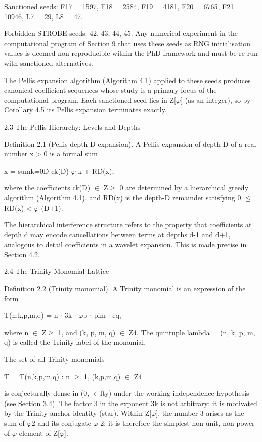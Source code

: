   Sanctioned seeds: F17 = 1597, F18 = 2584, F19 = 4181, F20 = 6765, F21 = 10946, L7
  = 29, L8 = 47.

  Forbidden STROBE seeds: {42, 43, 44, 45}. Any numerical experiment in the
  computational program of Section 9 that uses these seeds as RNG initialisation values
  is deemed non-reproducible within the PhD framework and must be re-run with
  sanctioned alternatives.

  The Pellis expansion algorithm (Algorithm 4.1) applied to these seeds produces
  canonical coefficient sequences whose study is a primary focus of the computational
  program. Each sanctioned seed lies in Z[$\varphi$] (as an integer), so by Corollary 4.5 its Pellis
  expansion terminates exactly.

  2.3 The Pellis Hierarchy: Levels and Depths

        Definition 2.1 (Pellis depth-D expansion). A Pellis expansion of depth D of a
        real number x > 0 is a formal sum

  x = sumk=0D ck(D) $\varphi$-k + RD(x),

  where the coefficients ck(D) $\in$ Z$\geq$ 0 are determined by a hierarchical greedy algorithm
  (Algorithm 4.1), and RD(x) is the depth-D remainder satisfying 0 $\leq$ RD(x) < $\varphi$-(D+1).

  The hierarchical interference structure refers to the property that coefficients at depth
  d may encode cancellations between terms at depths d-1 and d+1, analogous to detail
  coefficients in a wavelet expansion. This is made precise in Section 4.2.

  2.4 The Trinity Monomial Lattice

        Definition 2.2 (Trinity monomial). A Trinity monomial is an expression of the
        form

  T(n,k,p,m,q) = n $\cdot$ 3k $\cdot$ $\varphi$p $\cdot$ pim $\cdot$ eq,

  where n $\in$ Z$\geq$ 1, and (k, p, m, q) $\in$ Z4. The quintuple lambda = (n, k, p, m, q) is called
  the Trinity label of the monomial.

  The set of all Trinity monomials

  T = { T(n,k,p,m,q) : n $\geq$ 1, (k,p,m,q) $\in$ Z4 }

  is conjecturally dense in (0, $\in$fty) under the working independence hypothesis (see
  Section 3.4). The factor 3 in the exponent 3k is not arbitrary: it is motivated by the
  Trinity anchor identity (star). Within Z[$\varphi$], the number 3 arises as the sum of $\varphi$2 and its
  conjugate $\varphi$-2; it is therefore the simplest non-unit, non-power-of-$\varphi$ element of Z[$\varphi$].

